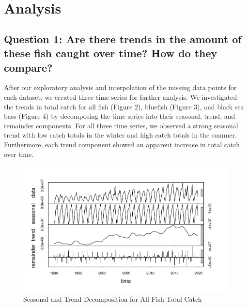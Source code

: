 \documentclass[
  12pt,
]{article}
\begin{document}
\newpage

\hypertarget{analysis}{%
\section{Analysis}\label{analysis}}

\hypertarget{question-1-are-there-trends-in-the-amount-of-these-fish-caught-over-time-how-do-they-compare}{%
\subsection{Question 1: Are there trends in the amount of these fish
caught over time? How do they
compare?}\label{question-1-are-there-trends-in-the-amount-of-these-fish-caught-over-time-how-do-they-compare}}

After our exploratory analysis and interpolation of the missing data
points for each dataset, we created three time series for further
analysis. We investigated the trends in total catch for all fish (Figure
2), bluefish (Figure 3), and black sea bass (Figure 4) by decomposing
the time series into their seasonal, trend, and remainder components.
For all three time series, we observed a strong seasonal trend with low
catch totals in the winter and high catch totals in the summer.
Furthermore, each trend component showed an apparent increase in total
catch over time.

\begin{figure}[H]

\hfill{}\includegraphics{Report_FishTrends_files/figure-latex/All Fish Trends-1} 

\caption{Seasonal and Trend Decomposition for All Fish Total Catch}\label{fig:All Fish Trends}
\end{figure}
\end{document}
